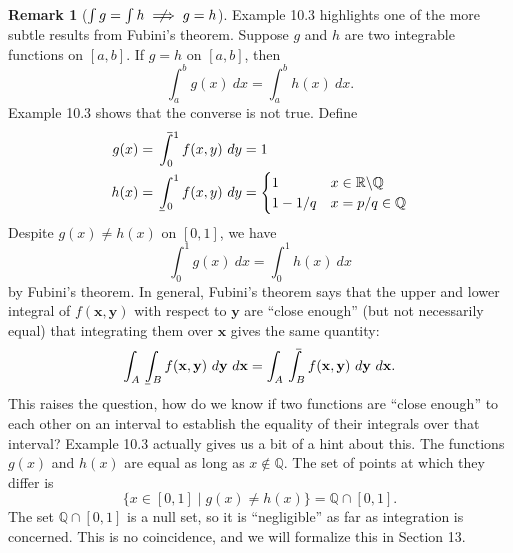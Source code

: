 \documentclass{article}
\def\upint{\mathchoice%
	{\mkern13mu\overline{\vphantom{\intop}\mkern7mu}\mkern-20mu}%
	{\mkern7mu\overline{\vphantom{\intop}\mkern7mu}\mkern-14mu}%
	{\mkern7mu\overline{\vphantom{\intop}\mkern7mu}\mkern-14mu}%
	{\mkern7mu\overline{\vphantom{\intop}\mkern7mu}\mkern-14mu}%
	\int}
\def\lowint{\mkern3mu\underline{\vphantom{\intop}\mkern7mu}\mkern-10mu\int}
\newcommand{\R}{\mathbb{R}}
\newcommand{\Q}{\mathbb{Q}}
\newcommand{\x}{\mathbf{x}}
\newcommand{\y}{\mathbf{y}}
\theoremstyle{definition}
\newtheorem{remark}{Remark}[section]
\begin{document}
\begin{remark}[$ \int g = \int h  \centernot{\implies}g = h $]
	Example 10.3 highlights one of the more subtle results from Fubini's theorem. Suppose $ g $ and $ h $ are two integrable functions on $ [a,b] $. If $ g = h$ on $ [a,b] $, then $$\int_{a}^{b}g(x)\ dx = \int_{a}^{b}h(x)\ dx. $$ Example 10.3 shows that the converse is not true. Define 
	\begin{align*}
	g(x) &= \upint_0^1 f(x,y)\ dy = 1\\
	h(x) & = \lowint_{0}^1 f(x,y)\ dy = \begin{cases}
		1 & x\in \R\backslash\Q\\
		1-1/q & x=p/q\in \Q
	\end{cases}
	\end{align*}
	Despite $ g(x)\neq h(x) $ on $ [0,1] $, we have 
	$$ \int_{0}^{1}g(x)\ dx = \int_{0}^{1}h(x)\ dx$$ by Fubini's theorem. In general, Fubini's theorem says that the upper and lower integral of $ f(\x,\y) $ with respect to $ \y $ are ``close enough'' (but not necessarily equal) that integrating them over $ \x $ gives the same quantity: $$\int_{A}\lowint_Bf(\x,\y)\ d\y\ d\x = \int_{A}\upint_Bf(\x,\y)\ d\y\ d\x.$$ This raises the question, how do we know if two functions are ``close enough'' to each other on an interval to establish the equality of their integrals over that interval? Example 10.3 actually gives us a bit of a hint about this. The functions $ g(x) $ and $ h(x) $ are equal as long as $ x\notin \Q $. The set of points at which they differ is 
	$$ \{x\in [0,1] \mid g(x)\neq h(x)\}= \Q\cap [0,1].$$ The set $ \Q\cap [0,1] $ is a null set, so it is ``negligible'' as far as integration is concerned. This is no coincidence, and we will formalize this in Section 13.
\end{remark}
\end{document}
